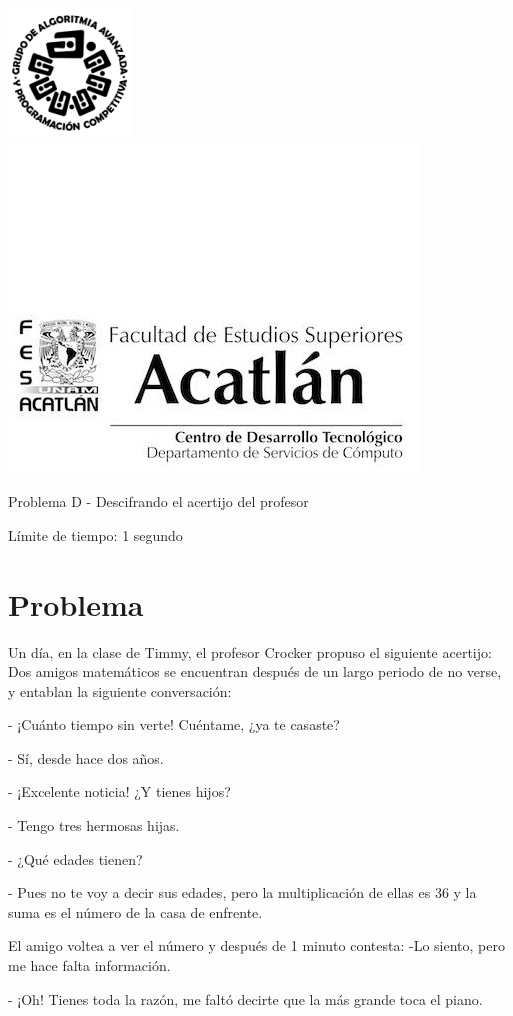 \includegraphics[scale=0.6]{logo} \hspace*{9.00cm}
\includegraphics[scale=0.5]{dsc} 
\bigskip
\begin{center}
	\Large Problema D - Descifrando el acertijo del profesor
\end{center}

\begin{flushright}
Límite de tiempo: 1 segundo
\par\end{flushright}

\section*{Problema}

Un día, en la clase de Timmy, el profesor Crocker propuso el siguiente acertijo: Dos amigos matemáticos se encuentran después de un largo periodo de no verse, y entablan la siguiente conversación:

\begin{itshape}
- ¡Cuánto tiempo sin verte! Cuéntame, ¿ya te casaste?

- Sí, desde hace dos años.

- ¡Excelente noticia! ¿Y tienes hijos?

- Tengo tres hermosas hijas.

- ¿Qué edades tienen?

- Pues no te voy a decir sus edades, pero la multiplicación de ellas es 36 y la suma es el número de la casa de enfrente.

El amigo voltea a ver el número y después de 1 minuto contesta: -Lo siento, pero me hace falta información.

- ¡Oh! Tienes toda la razón, me faltó decirte que la más grande toca el piano. 
\end{itshape}

